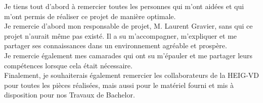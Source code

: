 Je tiens tout d'abord à remercier toutes les personnes qui m'ont aidées et qui m'ont permis de réaliser ce projet de manière optimale. \\

Je remercie d'abord mon responsable de projet, M. Laurent Gravier, sans qui ce projet n'aurait même pas existé. Il a su m'accompagner, m'expliquer
et me partager ses connaissances dans un environnement agréable et prospère. \\

Je remercie également mes camarades qui ont su m'épauler et me partager leurs compétences lorsque cela était nécessaire. \\

Finalement, je souhaiterais également remercier les collaborateurs de la HEIG-VD pour toutes les pièces réalisées, mais aussi pour le matériel
fourni et mis à disposition pour nos Travaux de Bachelor.